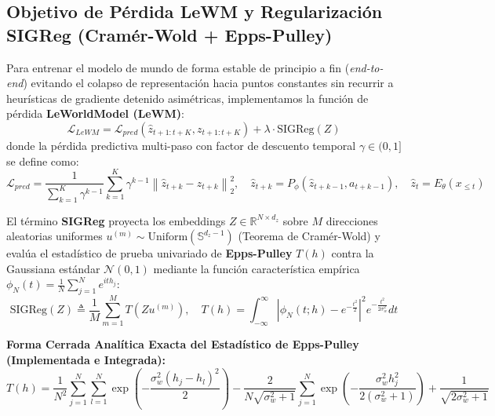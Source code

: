 \documentclass[10pt,a4paper]{article}
\begin{document}
\subsection{Objetivo de Pérdida LeWM y Regularización SIGReg (Cramér-Wold + Epps-Pulley)}
Para entrenar el modelo de mundo de forma estable de principio a fin (\textit{end-to-end}) evitando el colapso de representación hacia puntos constantes sin recurrir a heurísticas de gradiente detenido asimétricas, implementamos la función de pérdida \textbf{LeWorldModel (LeWM)}:
\begin{equation}
    \mathcal{L}_{LeWM} = \mathcal{L}_{pred}\left(\hat{z}_{t+1:t+K}, z_{t+1:t+K}\right) + \lambda \cdot \text{SIGReg}(Z)
\end{equation}
donde la pérdida predictiva multi-paso con factor de descuento temporal $\gamma \in (0, 1]$ se define como:
\begin{equation}
    \mathcal{L}_{pred} = \frac{1}{\sum_{k=1}^K \gamma^{k-1}} \sum_{k=1}^K \gamma^{k-1} \left\| \hat{z}_{t+k} - z_{t+k} \right\|_2^2, \quad \hat{z}_{t+k} = P_\phi(\hat{z}_{t+k-1}, a_{t+k-1}), \quad \hat{z}_t = E_\theta(x_{\le t})
\end{equation}

El término \textbf{SIGReg} proyecta los embeddings $Z \in \mathbb{R}^{N \times d_z}$ sobre $M$ direcciones aleatorias uniformes $u^{(m)} \sim \text{Uniform}(\mathbb{S}^{d_z-1})$ (Teorema de Cramér-Wold) y evalúa el estadístico de prueba univariado de \textbf{Epps-Pulley} $T(h)$ contra la Gaussiana estándar $\mathcal{N}(0, 1)$ mediante la función característica empírica $\phi_N(t) = \frac{1}{N}\sum_{j=1}^N e^{i t h_j}$:
\begin{equation}
    \text{SIGReg}(Z) \triangleq \frac{1}{M} \sum_{m=1}^M T\left(Z u^{(m)}\right), \quad T(h) = \int_{-\infty}^\infty \left| \phi_N(t; h) - e^{-\frac{t^2}{2}} \right|^2 e^{-\frac{t^2}{2\sigma_w^2}} dt
\end{equation}

\begin{mathbox}
\textbf{Forma Cerrada Analítica Exacta del Estadístico de Epps-Pulley (Implementada e Integrada):}
\begin{equation}
    \boxed{T(h) = \frac{1}{N^2}\sum_{j=1}^N\sum_{l=1}^N \exp\left( -\frac{\sigma_w^2(h_j - h_l)^2}{2} \right) - \frac{2}{N\sqrt{\sigma_w^2 + 1}}\sum_{j=1}^N \exp\left( -\frac{\sigma_w^2 h_j^2}{2(\sigma_w^2 + 1)} \right) + \frac{1}{\sqrt{2\sigma_w^2 + 1}}}
\end{equation}
\end{mathbox}
\end{document}
